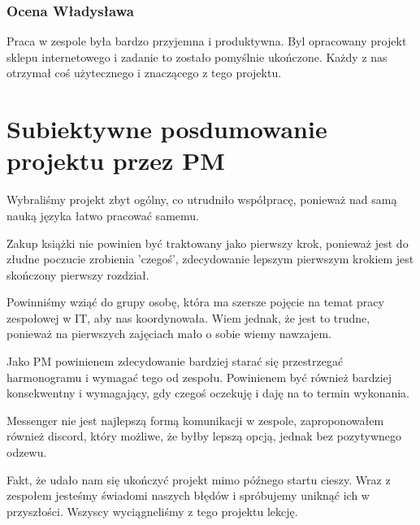 \documentclass{article}
\begin{document}
\subsubsection{Ocena Władysława}
Praca w zespole była bardzo przyjemna i produktywna. Byl opracowany projekt sklepu internetowego i zadanie to zostało pomyślnie ukończone. Każdy z nas otrzymał coś użytecznego i znaczącego z tego projektu.

\newpage
\section{Subiektywne posdumowanie projektu przez PM}
Wybraliśmy projekt zbyt ogólny, co utrudniło współpracę, ponieważ nad samą nauką języka łatwo pracować samemu.
\par Zakup książki nie powinien być traktowany jako pierwszy krok, ponieważ jest do złudne poczucie zrobienia 'czegoś', zdecydowanie lepszym pierwszym krokiem jest skończony pierwszy rozdział. \par Powinniśmy wziąć do grupy osobę, która ma szersze pojęcie na temat pracy zespołowej w IT, aby nas koordynowała. Wiem jednak, że jest to trudne, ponieważ na pierwszych zajęciach mało o sobie wiemy nawzajem.
\par Jako PM powinienem zdecydowanie bardziej starać się przestrzegać harmonogramu i wymagać tego od zespołu. Powinienem być również bardziej konsekwentny i wymagający, gdy czegoś oczekuję i daję na to termin wykonania. \par Messenger nie jest najlepszą formą komunikacji w zespole, zaproponowałem również discord, który możliwe, że byłby lepszą opcją, jednak bez pozytywnego odzewu.
\par Fakt, że udało nam się ukończyć projekt mimo późnego startu cieszy. Wraz z zespołem jesteśmy świadomi naszych błędów i spróbujemy uniknąć ich w przyszłości. Wszyscy wyciągneliśmy z tego projektu lekcję.
\end{document}

